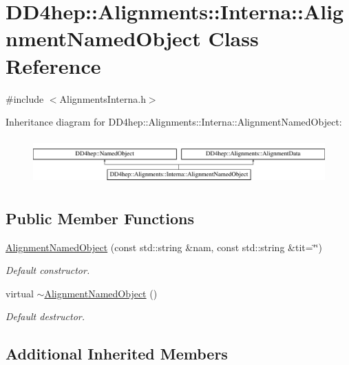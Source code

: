 \hypertarget{class_d_d4hep_1_1_alignments_1_1_interna_1_1_alignment_named_object}{}\section{D\+D4hep\+:\+:Alignments\+:\+:Interna\+:\+:Alignment\+Named\+Object Class Reference}
\label{class_d_d4hep_1_1_alignments_1_1_interna_1_1_alignment_named_object}


{\ttfamily \#include $<$Alignments\+Interna.\+h$>$}

Inheritance diagram for D\+D4hep\+:\+:Alignments\+:\+:Interna\+:\+:Alignment\+Named\+Object\+:\begin{figure}[H]
\begin{center}
\leavevmode
\includegraphics[height=1.777778cm]{class_d_d4hep_1_1_alignments_1_1_interna_1_1_alignment_named_object}
\end{center}
\end{figure}
\subsection*{Public Member Functions}
\begin{DoxyCompactItemize}
\item 
\hyperlink{class_d_d4hep_1_1_alignments_1_1_interna_1_1_alignment_named_object_a0446fa258b55e441adae43fd5f1c20e8}{Alignment\+Named\+Object} (const std\+::string \&nam, const std\+::string \&tit=\char`\"{}\char`\"{})
\begin{DoxyCompactList}\small\item\em Default constructor. \end{DoxyCompactList}\item 
virtual \hyperlink{class_d_d4hep_1_1_alignments_1_1_interna_1_1_alignment_named_object_a96f03450aa9af33962d86b7067473939}{$\sim$\+Alignment\+Named\+Object} ()
\begin{DoxyCompactList}\small\item\em Default destructor. \end{DoxyCompactList}\end{DoxyCompactItemize}
\subsection*{Additional Inherited Members}


